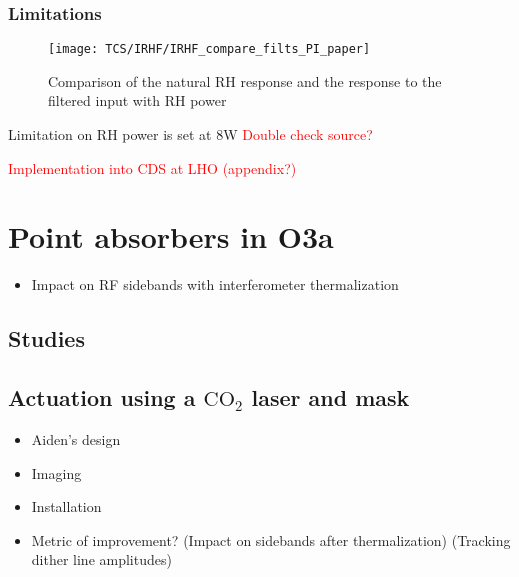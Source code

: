 \subsubsection{Limitations}
\begin{figure}[H]
\texttt{[image: TCS/IRHF/IRHF\_compare\_filts\_PI\_paper]}
\caption{Comparison of the natural RH response and the response to the filtered input with RH power}
\label{fig:RH_power}
\end{figure}
Limitation on RH power is set at 8W \textcolor{red}{Double check source?}

\textcolor{red}{Implementation into CDS at LHO (appendix?)}


\section{Point absorbers in O3a}

\begin{itemize}
\item Impact on RF sidebands with interferometer thermalization
\end{itemize}

\subsection{Studies}

\subsection{Actuation using a $\mathrm{CO_2}$ laser and mask}
\begin{itemize}
\item Aiden's design
\item Imaging
\item Installation

\item Metric of improvement? (Impact on sidebands after thermalization) (Tracking dither line amplitudes)
\end{itemize}
